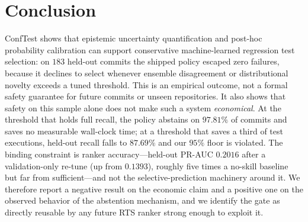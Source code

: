 \documentclass[sigconf,screen]{acmart}
\begin{document}
\section{Conclusion}
ConfTest shows that epistemic uncertainty quantification and post-hoc probability calibration can support conservative machine-learned regression test selection: on $183$ held-out commits the shipped policy escaped zero failures, because it declines to select whenever ensemble disagreement or distributional novelty exceeds a tuned threshold. This is an empirical outcome, not a formal safety guarantee for future commits or unseen repositories. It also shows that safety on this sample alone does not make such a system \emph{economical}. At the threshold that holds full recall, the policy abstains on $97.81\%$ of commits and saves no measurable wall-clock time; at a threshold that saves a third of test executions, held-out recall falls to $87.69\%$ and our $95\%$ floor is violated. The binding constraint is ranker accuracy---held-out PR-AUC $0.2016$ after a validation-only re-tune (up from $0.1393$), roughly five times a no-skill baseline but far from sufficient---and not the selective-prediction machinery around it. We therefore report a negative result on the economic claim and a positive one on the observed behavior of the abstention mechanism, and we identify the gate as directly reusable by any future RTS ranker strong enough to exploit it.



\end{document}

